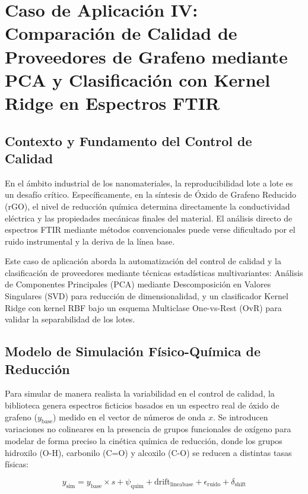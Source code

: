 \section{Caso de Aplicación IV: Comparación de Calidad de Proveedores de Grafeno mediante PCA y Clasificación con Kernel Ridge en Espectros FTIR}

\subsection{Contexto y Fundamento del Control de Calidad}
En el ámbito industrial de los nanomateriales, la reproducibilidad lote a lote es un desafío crítico. Específicamente, en la síntesis de Óxido de Grafeno Reducido (rGO), el nivel de reducción química determina directamente la conductividad eléctrica y las propiedades mecánicas finales del material. El análisis directo de espectros FTIR mediante métodos convencionales puede verse dificultado por el ruido instrumental y la deriva de la línea base. 

Este caso de aplicación aborda la automatización del control de calidad y la clasificación de proveedores mediante técnicas estadísticas multivariantes: Análisis de Componentes Principales (PCA) mediante Descomposición en Valores Singulares (SVD) para reducción de dimensionalidad, y un clasificador Kernel Ridge con kernel RBF bajo un esquema Multiclase One-vs-Rest (OvR) para validar la separabilidad de los lotes.

\subsection{Modelo de Simulación Físico-Química de Reducción}
Para simular de manera realista la variabilidad en el control de calidad, la biblioteca genera espectros ficticios basados en un espectro real de óxido de grafeno ($y_{\text{base}}$) medido en el vector de números de onda $x$. Se introducen variaciones no colineares en la presencia de grupos funcionales de oxígeno para modelar de forma preciso la cinética química de reducción, donde los grupos hidroxilo (O-H), carbonilo (C=O) y alcoxilo (C-O) se reducen a distintas tasas físicas:

\begin{equation}
    y_{\text{sim}} = y_{\text{base}} \times s + \psi_{\text{quim}} + \text{drift}_{\text{lineabase}} + \epsilon_{\text{ruido}} + \delta_{\text{shift}}
\end{equation}

